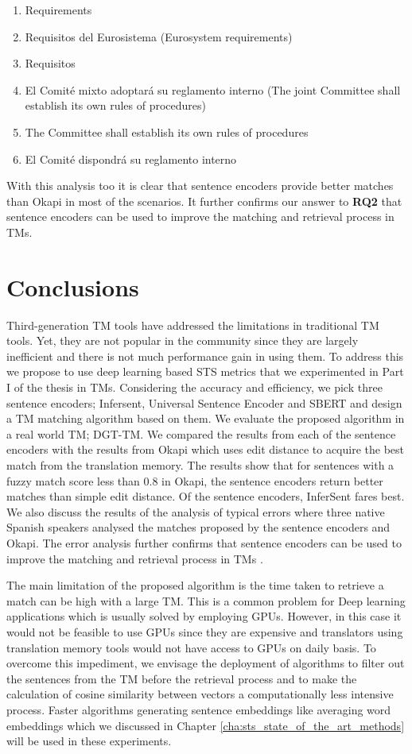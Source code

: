 \begin{enumerate}[resume,label={(\arabic*)}]
\item	Requirements
\item	Requisitos del Eurosistema (Eurosystem requirements)
\item	Requisitos
\item	El Comité mixto adoptará su reglamento interno (The joint Committee shall establish its own rules of procedures)
\item	The Committee shall establish its own rules of procedures
\item	El Comité dispondrá su reglamento interno
\end{enumerate}

With this analysis too it is clear that sentence encoders provide better matches than Okapi in most of the scenarios. It further confirms our answer to \textbf{RQ2} that sentence encoders can be used to improve the matching and retrieval process in TMs.

\section{Conclusions}
Third-generation TM tools have addressed the limitations in traditional TM tools. Yet, they are not popular in the community since they are largely inefficient and there is not much performance gain in using them. To address this we propose to use deep learning based STS metrics that we experimented in Part I of the thesis in TMs. Considering the accuracy and efficiency, we pick three sentence encoders; Infersent, Universal Sentence Encoder and SBERT and design a TM matching algorithm based on them. We evaluate the proposed algorithm in a real world TM; DGT-TM. We compared the results from each of the sentence encoders with the results from Okapi which uses edit distance to acquire the best match from the translation memory. The results show that for sentences with a fuzzy match score less than 0.8 in Okapi, the sentence encoders return better matches than simple edit distance. Of the sentence encoders, InferSent fares best. We also discuss the results of the analysis of typical errors where three native Spanish speakers analysed the matches proposed by the sentence encoders and Okapi. The error analysis further confirms that sentence encoders can be used to improve the matching and retrieval process in TMs \cite{ranasinghe-etal-2020-intelligent}. 

The main limitation of the proposed algorithm is the time taken to retrieve a match can be high with a large TM. This is a common problem for Deep learning applications which is usually solved by employing GPUs. However, in this case it would not be feasible to use GPUs since they are expensive and translators using translation memory tools would not have access to GPUs on daily basis. To overcome this impediment, we envisage the deployment of algorithms to filter out the sentences from the TM before the retrieval process and to make the calculation of cosine similarity between vectors a computationally less intensive process. Faster algorithms generating sentence embeddings like averaging word embeddings which we discussed in Chapter \ref{cha:sts_state_of_the_art_methods} will be used in these experiments. 

